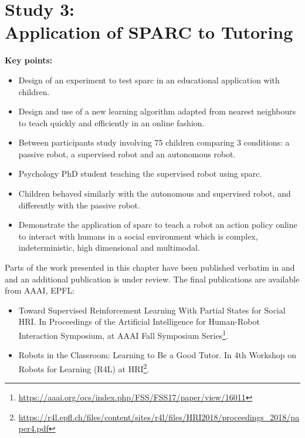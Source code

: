 \chapter[Study 3: Application of SPARC to Tutoring]{Study 3: \\Application of SPARC to Tutoring}\label{chap:tutoring}
\glsresetall
\graphicspath{{images/tutoring/}}

\begin{framed}
	\textbf{Key points:}
	
	\begin{itemize}
		\item Design of an experiment to test \acrshort{sparc} in an educational application with children.
		\item Design and use of a new learning algorithm adapted from nearest neighbours to teach quickly and efficiently in an online fashion.
		\item Between participants study involving 75 children comparing 3 conditions: a passive robot, a supervised robot and an autonomous robot.
		\item Psychology PhD student teaching the supervised robot using \acrshort{sparc}.
		\item Children behaved similarly with the autonomous and supervised robot, and differently with the passive robot.
		\item Demonstrate  the application of \acrshort{sparc} to teach a robot an action policy online to interact with humans in a social environment which is complex, indeterministic, high dimensional and multimodal.
	\end{itemize}
\end{framed}

Parts of the work presented in this chapter have been published verbatim in \cite{senft2017toward} and \cite{senft2018robots} and an additional publication is under review. The final publications are available from AAAI, EPFL:
\begin{itemize}
	\item Toward Supervised
	Reinforcement Learning With Partial States for Social HRI. In Proceedings of the Artificial Intelligence for Human-Robot Interaction Symposium, at AAAI Fall Symposium Series\footnote{\url{https://aaai.org/ocs/index.php/FSS/FSS17/paper/view/16011}}.
	\item Robots in the Classroom: Learning to Be a Good Tutor. In 4th Workshop on Robots for Learning (R4L) at HRI\footnote{\url{https://r4l.epfl.ch/files/content/sites/r4l/files/HRI2018/proceedings_2018/paper4.pdf}}.
\end{itemize} 

